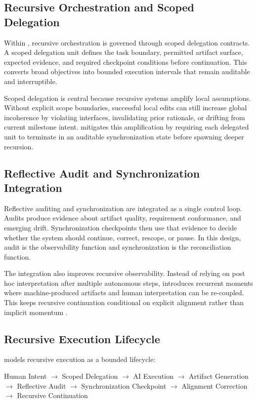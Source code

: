 \subsection{Recursive Orchestration and Scoped Delegation}

Within , recursive orchestration is governed through scoped delegation contracts. A scoped delegation unit defines the task boundary, permitted artifact surface, expected evidence, and required checkpoint conditions before continuation. This converts broad objectives into bounded execution intervals that remain auditable and interruptible.

Scoped delegation is central because recursive systems amplify local assumptions. Without explicit scope boundaries, successful local edits can still increase global incoherence by violating interfaces, invalidating prior rationale, or drifting from current milestone intent.  mitigates this amplification by requiring each delegated unit to terminate in an auditable synchronization state before spawning deeper recursion.

\subsection{Reflective Audit and Synchronization Integration}

Reflective auditing and synchronization are integrated as a single control loop. Audits produce evidence about artifact quality, requirement conformance, and emerging drift. Synchronization checkpoints then use that evidence to decide whether the system should continue, correct, rescope, or pause. In this design, audit is the observability function and synchronization is the reconciliation function.

The integration also improves recursive observability. Instead of relying on post hoc interpretation after multiple autonomous steps,  introduces recurrent moments where machine-produced artifacts and human interpretation can be re-coupled. This keeps recursive continuation conditional on explicit alignment rather than implicit momentum \cite{Chandy1985DistributedSnapshots,Lamport1978TimeClocks}.

\subsection{Recursive Execution Lifecycle}

 models recursive execution as a bounded lifecycle:
\begin{center}
Human Intent $\rightarrow$ Scoped Delegation $\rightarrow$ AI Execution $\rightarrow$ Artifact Generation $\rightarrow$ Reflective Audit $\rightarrow$ Synchronization Checkpoint $\rightarrow$ Alignment Correction $\rightarrow$ Recursive Continuation
\end{center}

